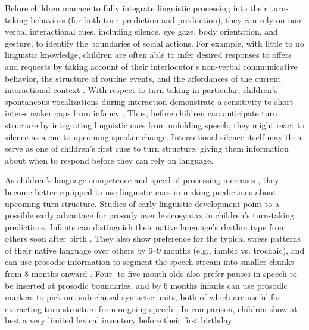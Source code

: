 \documentclass[authoryear, 12pt]{elsarticle}
\begin{document}
Before children manage to fully integrate linguistic processing into their turn-taking behaviors (for both turn prediction and production), they can rely on non-verbal interactional cues, including silence, eye gaze, body orientation, and gesture, to identify the boundaries of social actions. For example, with little to no linguistic knowledge, children are often able to infer desired responses to offers and requests by taking account of their interlocutor's non-verbal communicative behavior, the structure of routine events, and the affordances of the current interactional context \citep{reddy13, nomikou11, shatz78}. With respect to turn taking in particular, children's spontaneous vocalizations during interaction demonstrate a sensitivity to short inter-speaker gaps from infancy \citep{hilbrink2015}. Thus, before children can anticipate turn structure by integrating linguistic cues from unfolding speech, they might react to silence as a cue to upcoming speaker change. Interactional silence itself may then serve as one of children's first cues to turn structure, giving them information about when to respond before they can rely on language.

As children's language competence and speed of processing increases \citep{kail1991}, they become better equipped to use linguistic cues in making predictions about upcoming turn structure. Studies of early linguistic development point to a possible early advantage for prosody over lexicosyntax in children's turn-taking predictions. Infants can distinguish their native language's rhythm type from others soon after birth \citep{mehler1988, nazzi2003}. They also show preference for the typical stress patterns of their native language over others by 6--9 months (e.g., iambic vs. trochaic), and can use prosodic information to segment the speech stream into smaller chunks from 8 months onward \citep{johnson2001, morgan1995}. Four- to five-month-olds also prefer pauses in speech to be inserted at prosodic boundaries, and by 6 months infants can use prosodic markers to pick out sub-clausal syntactic units, both of which are useful for extracting turn structure from ongoing speech \citep{jusczyk1995, soderstrom2003}. In comparison, children show at best a very limited lexical inventory before their first birthday \citep{bergelson2013, shi2010}.
\end{document}
